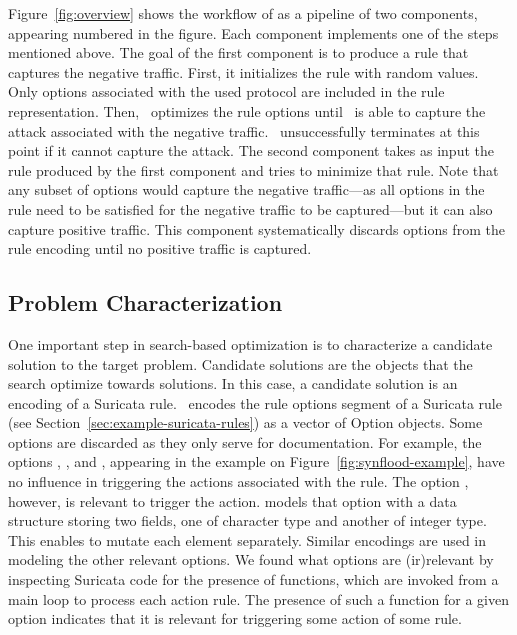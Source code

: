 \documentclass[runningheads]{llncs}
\begin{document}


Figure~\ref{fig:overview} shows the workflow of \tname{} as a pipeline
of two components, appearing numbered in the figure. Each component
implements one of the steps mentioned above. The goal of the first
component is to produce a rule that captures the negative traffic.
First, it initializes the rule with random values. Only options
associated with the used protocol are included in the rule
representation. Then, \tname\ optimizes the rule options until
\suri\ is able to capture the attack associated with the negative
traffic.  \tname\ unsuccessfully terminates at this point if it cannot
capture the attack. The second component takes as input the rule
produced by the first component and tries to minimize that rule. Note
that any subset of options would capture the negative traffic---as all
options in the rule need to be satisfied for the negative traffic to
be captured---but it can also capture positive traffic. This component
systematically discards options from the rule encoding until no
positive traffic is captured.

\subsection{Problem Characterization}

One important step in search-based optimization is to characterize a
candidate solution to the target problem. Candidate solutions are the
objects that the search optimize towards solutions. In this case, a 
candidate solution is an encoding of a Suricata rule.  \tname\ encodes
the rule options segment of a Suricata rule (see
Section~\ref{sec:example-suricata-rules}) as a vector of Option
objects. Some options are discarded as they only serve for
documentation. For example, the options ,
, and , appearing in the
example on Figure~\ref{fig:synflood-example}, have no influence in
triggering the actions associated with the rule. The option
, however, is relevant to trigger the action. \tname{}
models that option with a data structure storing two fields, one of
character type and another of integer type. This enables \tname{} to
mutate each element separately. Similar encodings are used in modeling
the other relevant options. We found what options are (ir)relevant by
inspecting Suricata code for the presence of  functions,
which are invoked from a main loop to process each action rule. The
presence of such a function for a given option indicates that it is
relevant for triggering some action of some rule.
\end{document}
